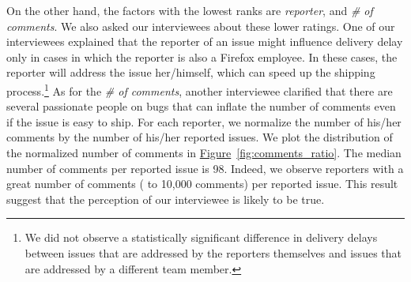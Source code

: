 \begin{sloppypar}
On the other hand, the factors with the lowest ranks are {\em reporter}, and
{\em \# of comments}. We also asked our interviewees about these lower ratings.
One of our interviewees explained that the reporter of an issue might influence
delivery delay only in cases in which the reporter is also a Firefox
employee. In these cases, the reporter will address the issue her/himself, which
can speed up the shipping process.\footnote{We did not observe a statistically
	significant difference in delivery delays between issues that are
addressed by the reporters themselves and issues that are addressed by a
different team member.} As for the {\em \# of comments}, another interviewee
clarified that there are several passionate people on bugs that can inflate the
number of comments even if the issue is easy to ship. For each reporter, we
normalize the number of his/her comments by the number of his/her reported issues.  We
plot the distribution of the normalized number of comments in
\hyperref[fig:comments_ratio]{Figure}~\ref{fig:comments_ratio}. The median
number of comments per reported issue is 98. Indeed, we observe reporters with a
great number of comments ( to 10,000 comments) per reported issue.
This result suggest that the perception of our interviewee is likely to be true.


\end{sloppypar}
